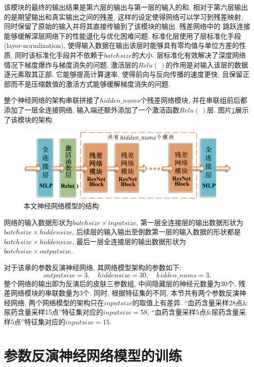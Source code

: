 \documentclass[a4paper,punct=banjiao,twoside]{ctexrep}
\theoremstyle{plain}
\theoremstyle{definition}
\theoremstyle{remark}
\begin{document}
该模块的最终的输出结果是第六层的输出与第一层的输入的和, 相对于第六层输出的是期望输出和真实输出之间的残差, 这样的设定使得网络可以学习到残差映射, 同时保留了原始的输入并将其直接传输到了该模块的输出\cite{16,17}. 残差网络中的
跳跃连接能够缓解深层网络下的性能退化与优化困难问题\cite{17}. 标准化层使用了层标准化手段(layer-normlization), 使得输入数据在输出该层时能够具有零均值与单位方差的性质, 同时该标准化手段并不依赖于$batchsize$的大小\cite{19}.
层标准化有效解决了深度网络情况下梯度爆炸与梯度消失的问题. 激活层的$Relu(\,)$的作用是对输入该层的数据逐元素取其正部. 它能够提高计算速率, 使得前向与反向传播的速度更快, 且保留正部而不是压缩数值的激活方式能够缓解梯度消失的问题\cite{20}.

整个神经网络的架构串联拼接了$hidden\_nums$个残差网络模块, 并在串联组前后都添加了一层全连接网络, 输入端还额外添加了一个激活函数$Relu(\,)$层. 图片\ref{网络结构}展示了该模块的架构.

\begin{figure}[H]
  \centering
  \includegraphics[scale=0.6]{./figs/p5_2.png}
  \caption{本文神经网络模型的结构}
  \label{网络结构}
\end{figure}

\noindent 网络的输入数据形状为$batchsize \times inputsize$, 第一层全连接层的输出数据形状为$batchsize \times hiddensize$, 后续层的输入输出至倒数第一层的输入数据的形状都是$batchsize \times hiddensize$, 最后一层全连接层的输出数据形状为$batchsize \times outputsize$.

对于该章的参数反演神经网络, 其网络模型架构的参数如下:
$$
outputsize = 3, \quad hiddensize = 30, \quad hidden\_nums = 3.
$$
\noindent 整个网络的输出即为反演后的皮肤三参数组, 中间隐藏层的神经元数量为30个, 残差网络模块的串联数量为3个. 同时, 根据特征集的不同, 本节共有两个参数反演神经网络, 两个网络模型的架构只在$inputsize$的取值上有差异. ``血药含量采样28点\&尿药含量采样15点''特征集对应的$inputsize=58$, ``血药含量采样5点\&尿药含量采样5点''特征集对应的$inputsize=15$.

\section{参数反演神经网络模型的训练}
\label{3.4}
\end{document}
